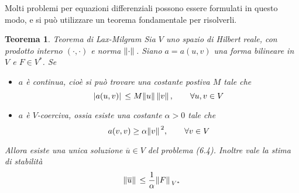 \documentclass[a4paper,12pt, draft]{article}
\theoremstyle{break}
\newtheorem{theorem}{Teorema}[section]
\numberwithin{equation}{section}
\begin{document}
Molti problemi per equazioni differenziali possono essere formulati in questo modo, e si può utilizzare un teorema fondamentale per risolverli.
\begin{theorem}{Teorema di Lax-Milgram}
  Sia \(V\) uno spazio di Hilbert reale, con prodotto interno \((\cdot, \cdot)\) e norma \(\norm*{\cdot}\). Siano \(a = a(u,v)\) una forma bilineare in \(V\) e \(F \in V^*\). Se 
  \begin{itemize}
    \item[i)] \(a\) è continua, cioè si può trovare una costante postiva \(M\) tale che 
    \[
      \abs*{a(u,v)} \leq M\norm*{u}\norm*{v}, \qquad \forall u, v \in V
    \]
    \item[ii)] \(a\) è \(V\)-coerciva, ossia esiste una costante \(\alpha > 0\) tale che
    \[
      a(v,v) \geq \alpha\norm*{v}^2, \qquad \forall v \in V
    \]
  \end{itemize}
  Allora esiste una unica soluzione \(\overline{u} \in V\) del problema (6.4). Inoltre vale la stima di stabilità
  \begin{equation}
    \norm*{\overline{u}} \leq \frac{1}{\alpha} \norm*{F}_{V^*}
  \end{equation}
\end{theorem}
\end{document}
